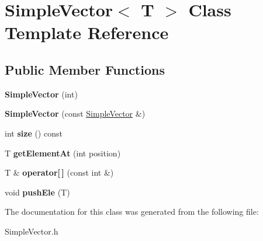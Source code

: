 \hypertarget{class_simple_vector}{}\section{Simple\+Vector$<$ T $>$ Class Template Reference}
\label{class_simple_vector}
\subsection*{Public Member Functions}
\begin{DoxyCompactItemize}
\item 
\hypertarget{class_simple_vector_ae66eef8fd426011908439a67199a846f}{}{\bfseries Simple\+Vector} (int)\label{class_simple_vector_ae66eef8fd426011908439a67199a846f}

\item 
\hypertarget{class_simple_vector_a0b5773adfe6b3bc25172024324bcf8fb}{}{\bfseries Simple\+Vector} (const \hyperlink{class_simple_vector}{Simple\+Vector} \&)\label{class_simple_vector_a0b5773adfe6b3bc25172024324bcf8fb}

\item 
\hypertarget{class_simple_vector_a27f7b34d8229696d069534115918ecd8}{}int {\bfseries size} () const \label{class_simple_vector_a27f7b34d8229696d069534115918ecd8}

\item 
\hypertarget{class_simple_vector_a15c9857e4763f0be3d67d6fa21d2e2a5}{}T {\bfseries get\+Element\+At} (int position)\label{class_simple_vector_a15c9857e4763f0be3d67d6fa21d2e2a5}

\item 
\hypertarget{class_simple_vector_a17d999990d140549add60ca8ed748059}{}T \& {\bfseries operator\mbox{[}$\,$\mbox{]}} (const int \&)\label{class_simple_vector_a17d999990d140549add60ca8ed748059}

\item 
\hypertarget{class_simple_vector_ac12f36b31037155743eb2ce4bf643443}{}void {\bfseries push\+Ele} (T)\label{class_simple_vector_ac12f36b31037155743eb2ce4bf643443}

\end{DoxyCompactItemize}


The documentation for this class was generated from the following file\+:\begin{DoxyCompactItemize}
\item 
Simple\+Vector.\+h\end{DoxyCompactItemize}
